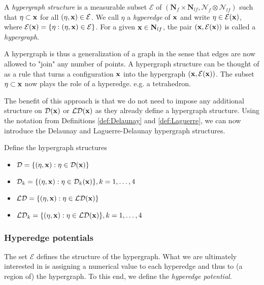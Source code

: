\begin{definition}
	A \textit{hypergraph structure} is a measurable subset $\mathcal E$ of $(\mathbf N_f\times \mathbf N_{lf}, \mathcal N_f \otimes \mathcal N_{lf})$ such that $\eta \subset {\mathbf{x}}$ for all $(\eta,{\mathbf{x}})\in\mathcal E$. We call $\eta$ a \textit{hyperedge} of ${\mathbf{x}}$ and write $\eta \in \mathcal E({\mathbf{x}})$, where $\mathcal E({\mathbf{x}}) = \{\eta: (\eta,{\mathbf{x}}) \in \mathcal E\}$. For a given ${\mathbf{x}} \in \mathbf N_{lf}$, the pair $({\mathbf{x}}, \mathcal E({\mathbf{x}}))$ is called a \textit{hypergraph}.
\end{definition}
A hypergraph is thus a generalization of a graph in the sense that edges are now allowed to "join" any number of points. A hypergraph structure can be thought of as a rule that turns a configuration ${\mathbf{x}}$ into the hypergraph $({\mathbf{x}},\mathcal E({\mathbf{x}}))$. 
The subset $\eta \subset {\mathbf{x}}$ now plays the role of a hyperedge. e.g. a tetrahedron.

The benefit of this approach is that we do not need to impose any additional structure on $\mathcal D({\mathbf{x}})$ or $\mathcal {LD}({\mathbf{x}})$ as they already define a hypergraph structure. Using the notation from Definitions \ref{def:Delaunay} and \ref{def:Laguerre}, we can now introduce the Delaunay and Laguerre-Delaunay hypergraph structures. 

\begin{definition}
	Define the hypergraph structures
	\begin{itemize}
		\item $\mathcal D = \{(\eta,{\mathbf{x}}): \eta \in \mathcal D({\mathbf{x}})\}$
		\item 	$\mathcal D_k = \{(\eta,{\mathbf{x}}): \eta \in \mathcal D_k({\mathbf{x}})\}, k=1,\dots,4$
		\item 	$\mathcal {LD} = \{(\eta,{\mathbf{x}}): \eta \in \mathcal {LD}({\mathbf{x}})\}$
		\item 	$\mathcal {LD}_k = \{(\eta,{\mathbf{x}}): \eta \in \mathcal {LD}({\mathbf{x}})\}, k=1,\dots,4$
	\end{itemize}
\end{definition}


\subsubsection{Hyperedge potentials}
The set $\mathcal E$ defines the structure of the hypergraph. What we are ultimately interested in is assigning a numerical value to each hyperedge and thus to (a region of) the hypergraph. To this end, we define the \textit{hyperedge potential}.

